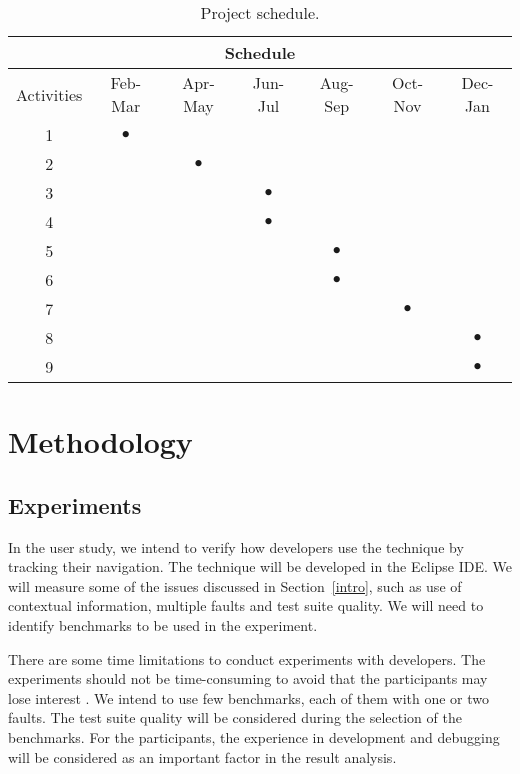\documentclass[12pt,a4paper,espaco=umemeio,noindentfirst,oneside,openany,tocpage=plain,pnumromarab,ruledheader,time,anapcustomindent]{sty/abnt}
\begin{document}
\begin{table}
\caption{Project schedule.}
\label{tab-timeline}
\centering
\begin{tabular}{|c||c|c|c|c|c|c|}
\hline
\multicolumn{7}{|c|}{Schedule} \\
\hline
\cline{2-7} Activities & Feb-Mar & Apr-May & Jun-Jul & Aug-Sep & Oct-Nov & Dec-Jan \\
\hline 1 & $\bullet$ &  &  &  &  &  \\
\hline 2 &  & $\bullet$ &  &  &  &  \\
\hline 3 &  &  & $\bullet$ &  &  &  \\
\hline 4 &  &  & $\bullet$ &  &  &  \\
\hline 5 &  &  &  & $\bullet$ &  &  \\
\hline 6 &  &  &  & $\bullet$ &  &  \\
\hline 7 &  &  &  &  & $\bullet$ &  \\
\hline 8 &  &  &  &  &  & $\bullet$ \\
\hline 9 &  &  &  &  &  & $\bullet$ \\
\hline
\end{tabular}
\end{table}

\section{Methodology}
\label{methodology}

\subsection{Experiments}
\label{experiments}

In the user study, we intend to verify how developers use the technique by tracking their navigation. The technique will 
be developed in the Eclipse IDE. We will measure some of the issues discussed in Section~\ref{intro}, such as use of 
contextual information, multiple faults and test suite quality. We will need to identify benchmarks to be used in the 
experiment.

There are some time limitations to conduct experiments with developers. The experiments should not be time-consuming 
to avoid that the participants may lose interest \cite{wainer2006}. We intend to use few benchmarks, each of them with 
one or two faults. The test suite quality will be considered during the selection of the benchmarks. For the participants, 
the experience in development and debugging will be considered as an important factor in the result analysis.
\end{document}
